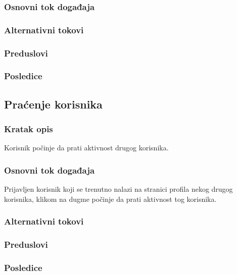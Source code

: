 \subsubsection{Osnovni tok događaja}

\subsubsection{Alternativni tokovi}

\subsubsection{Preduslovi}

\subsubsection{Posledice}




\subsection{Praćenje korisnika}
\label{subsec:pracenje-korisnika}

\subsubsection{Kratak opis}
Korisnik počinje da prati aktivnost drugog korisnika.
\subsubsection{Osnovni tok događaja}
Prijavljen korisnik koji se trenutno nalazi na stranici profila nekog drugog korisnika, klikom na dugme  počinje da prati aktivnost tog korisnika.
\subsubsection{Alternativni tokovi}

\subsubsection{Preduslovi}

\subsubsection{Posledice}
